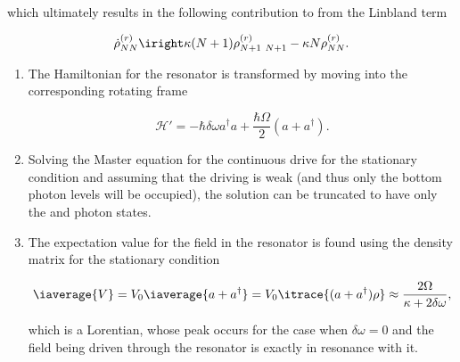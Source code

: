 \noindent which ultimately results in the following contribution to from the Linbland term

\begin{equation}\label{ar3}
  \dot{\rho}_{NN}^{(r)} \iright \kappa(N+1)\rho_{N+1\ N+1}^{(r)} - \kappa N \rho_{NN}^{(r)}.
\end{equation}


\begin{enumerate}
\item The Hamiltonian for the resonator is transformed by moving into the corresponding rotating frame
	
	\begin{equation}\label{ar4}
          \mathcal{H'} = -\hbar\delta\omega a^{\dagger}a+\frac{\hbar\Omega}{2}(a+a^{\dagger}).
	\end{equation}
	
      \item Solving the Master equation for the continuous drive for the stationary condition and assuming that the driving is
        weak (and thus only the bottom photon levels will be occupied), the solution can be truncated to have only the 
        and  photon states.
	
	\begin{figure}[h]
           
	\end{figure}
	
      \item The expectation value for the field in the resonator is found using the density matrix for the stationary condition
	
	\begin{equation}\label{filedRes}
          \iaverage{V} = V_0\iaverage{a+a^{\dagger}} = V_0\itrace{(a+a^{\dagger})\rho}\approx\frac{2\Omega}{\kappa+2\delta\omega},
	\end{equation}
	
	\noindent which is a Lorentian, whose peak occurs for the case when $ \delta\omega=0 $ and the field being driven through
        the resonator is exactly in resonance with it.
      \end{enumerate}

      \noindent {}

